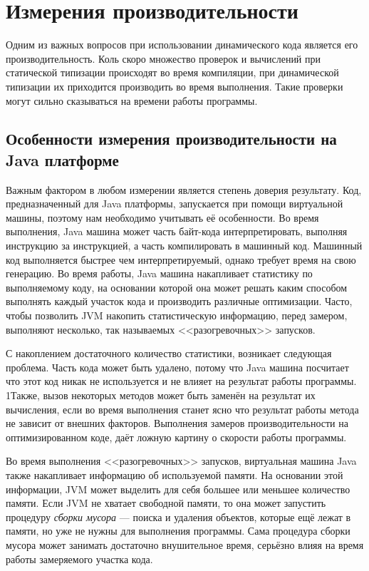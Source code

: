 \section{Измерения производительности}

Одним из важных вопросов при использовании динамического кода является его производительность. Коль скоро множество проверок и вычислений при статической типизации происходят во время компиляции, при динамической типизации их приходится производить во время выполнения. Такие проверки могут сильно сказываться на времени работы программы.

\subsection{Особенности измерения производительности на Java платформе}

Важным фактором в любом измерении является степень доверия результату. Код, предназначенный для Java платформы, запускается при помощи виртуальной машины, поэтому нам необходимо учитывать её особенности. Во время выполнения, Java машина может часть байт-кода интерпретировать, выполняя инструкцию за инструкцией, а часть  компилировать в машинный код. Машинный код выполняется быстрее чем интерпретируемый, однако требует время на свою генерацию. Во время работы, Java машина накапливает статистику по выполняемому коду, на основании которой она может решать каким способом выполнять каждый участок кода и производить различные оптимизации. Часто, чтобы позволить JVM накопить статистическую информацию, перед замером, выполняют несколько, так называемых <<разогревочных>> запусков.

С накоплением достаточного количество статистики, возникает следующая проблема. Часть кода может быть удалено, потому что Java машина посчитает что этот код никак не используется и не влияет на результат работы программы. 1Также, вызов некоторых методов может быть заменён на результат их вычисления, если во время выполнения станет ясно что результат работы метода не зависит от внешних факторов. Выполнения замеров производительности на оптимизированном коде, даёт ложную картину о скорости работы программы.

Во время выполнения <<разогревочных>> запусков, виртуальная машина Java также накапливает информацию об используемой памяти. На основании этой информации, JVM может выделить для себя большее или меньшее количество памяти. Если JVM не хватает свободной памяти, то она может запустить процедуру \textit{сборки мусора} --- поиска и удаления объектов, которые ещё лежат в памяти, но уже не нужны для выполнения программы. Сама процедура сборки мусора может занимать достаточно внушительное время, серьёзно влияя на время работы замеряемого участка кода.

